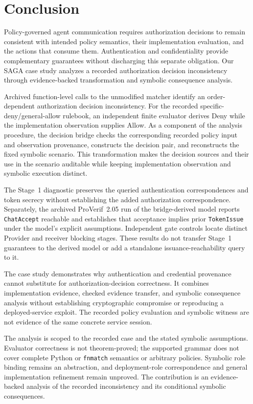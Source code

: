 \section{Conclusion}
\label{sec:conclusion}

Policy-governed agent communication requires authorization decisions to remain
consistent with intended policy semantics, their implementation evaluation,
and the actions that consume them. Authentication and confidentiality provide
complementary guarantees without discharging this separate obligation. Our
SAGA case study analyzes a recorded authorization decision inconsistency
through evidence-backed transformation and symbolic consequence analysis.

Archived function-level calls to the unmodified matcher identify an
order-dependent authorization decision inconsistency. For the recorded
specific-deny/general-allow rulebook, an independent finite evaluator derives
Deny while the implementation observation supplies Allow. As a component of
the analysis procedure, the decision bridge checks the corresponding recorded
policy input and observation provenance, constructs the decision pair, and
reconstructs the fixed symbolic scenario. This transformation makes the
decision sources and their use in the scenario auditable while keeping
implementation observation and symbolic execution distinct.

The Stage~1 diagnostic preserves the queried authentication correspondences
and token secrecy without establishing the added authorization correspondence.
Separately, the archived ProVerif~2.05 run of the bridge-derived model reports
\texttt{ChatAccept} reachable and establishes that acceptance implies prior
\texttt{TokenIssue} under the model's explicit assumptions. Independent gate
controls locate distinct Provider and
receiver blocking stages. These results do not transfer Stage~1 guarantees
to the derived model or add a standalone issuance-reachability query to it.

The case study demonstrates why authentication and credential provenance
cannot substitute for authorization-decision correctness. It combines
implementation evidence, checked evidence transfer, and symbolic consequence
analysis without establishing cryptographic compromise or reproducing a
deployed-service exploit. The recorded policy evaluation and symbolic witness
are not evidence of the same concrete service session.

The analysis is scoped to the recorded case and the stated symbolic assumptions.
Evaluator correctness is not theorem-proved;
the supported grammar does not cover complete Python or \texttt{fnmatch}
semantics or arbitrary policies. Symbolic role binding remains an abstraction,
and deployment-role correspondence and general implementation refinement remain
unproved. The contribution is an evidence-backed analysis of the recorded
inconsistency and its conditional symbolic consequences.

